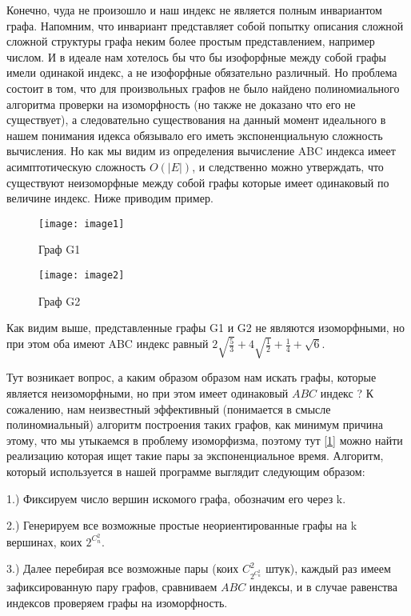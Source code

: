 \documentclass{article}
\begin{document}
Конечно, чуда не произошло и наш индекс не является полным инвариантом графа. Напомним, что инвариант представляет собой попытку описания сложной сложной структуры графа неким более простым представлением, например числом. И в идеале нам хотелось бы что бы изофорфные между собой графы имели одинакой индекс, а не изофорфные обязательно различный. Но проблема состоит в том, что для произвольных графов не было найдено полиномиального алгоритма проверки на изоморфность (но также не доказано что его не существует), а следовательно существования на данный момент идеального в нашем понимания идекса обязывало его иметь экспоненциальную сложность вычисления. Но как мы видим из определения вычисление ABC индекса имеет асимптотическую сложность $O(|E|)$, и следственно можно утверждать, что существуют неизоморфные между собой графы которые имеет одинаковый по величине индекс. Ниже приводим пример.

\begin{figure}[h]
\texttt{[image: image1]}
\centering
\caption{Граф G1}
\end{figure}

\begin{figure}[h]
\texttt{[image: image2]}
\centering
\caption{Граф G2}
\end{figure}

Как видим выше, представленные графы  G1 и G2 не являются изоморфными, но при этом оба имеют ABC индекс равный $2 \sqrt{\frac{5}{3}} + 4 \sqrt{\frac{1}{2}} + \frac{1}{4} + \sqrt{6}$. 

Тут возникает вопрос, а каким образом образом нам искать графы, которые является неизоморфными, но при этом имеет одинаковый $ABC$ индекс ? К сожалению, нам неизвестный эффективный (понимается в смысле полиномиальный) алгоритм построения таких графов, как минимум причина этому, что мы утыкаемся в проблему изоморфизма, поэтому тут \hyperlink{first_bibitem}{[1]} можно найти реализацию которая ищет такие пары за экспоненциальное время. Алгоритм, который используется в нашей программе выглядит следующим образом:

1.) Фиксируем число вершин искомого графа, обозначим его через k.

2.) Генерируем все возможные простые неориентированные графы на k вершинах, коих $2 ^ {C_n^2}$.  

3.) Далее перебирая все возможные пары (коих $C_{2 ^ {C_n^2}}^{2}$ штук), каждый раз имеем зафиксированную пару графов, сравниваем $ABC$ индексы, и в случае равенства индексов проверяем графы на изоморфность.
\end{document}
